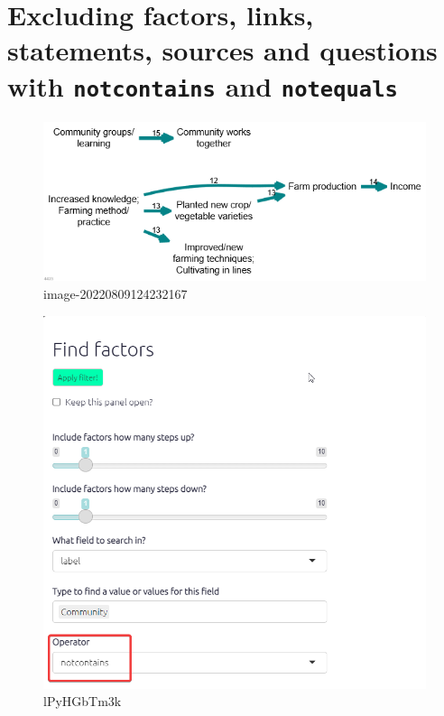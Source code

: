 \documentclass[
]{book}
\begin{document}
\hypertarget{excluding-factors-links-statements-sources-and-questions-with-notcontains-and-notequals}{%
\section{\texorpdfstring{Excluding factors, links, statements, sources and questions with \texttt{notcontains} and \texttt{notequals}}{Excluding factors, links, statements, sources and questions with notcontains and notequals}}\label{excluding-factors-links-statements-sources-and-questions-with-notcontains-and-notequals}}

\begin{figure}
\centering
\includegraphics[width=6.77083in,height=\textheight]{_assets/image-20220809124232167.png}
\caption{image-20220809124232167}
\end{figure}

\begin{figure}
\centering
\includegraphics[width=6.77083in,height=\textheight]{_assets/lPyHGbTm3k.png}
\caption{lPyHGbTm3k}
\end{figure}
\end{document}
